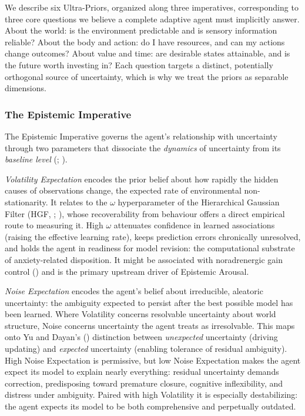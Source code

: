 \documentclass[
  jou,
  floatsintext,
  longtable,
  nolmodern,
  notxfonts,
  notimes,
  12pt,
  colorlinks=true,linkcolor=blue,citecolor=blue,urlcolor=blue]{apa7}
\begin{document}
We describe six Ultra-Priors, organized along three imperatives,
corresponding to three core questions we believe a complete adaptive
agent must implicitly answer. About the world: is the environment
predictable and is sensory information reliable? About the body and
action: do I have resources, and can my actions change outcomes? About
value and time: are desirable states attainable, and is the future worth
investing in? Each question targets a distinct, potentially orthogonal
source of uncertainty, which is why we treat the priors as separable
dimensions.

\subsubsection{The Epistemic Imperative}\label{the-epistemic-imperative}

The Epistemic Imperative governs the agent's relationship with
uncertainty through two parameters that dissociate the \emph{dynamics}
of uncertainty from its \emph{baseline level}
(;
).

\emph{Volatility Expectation} encodes the prior belief about how rapidly
the hidden causes of observations change, the expected rate of
environmental non-stationarity. It relates to the \(\omega\)
hyperparameter of the Hierarchical Gaussian Filter (HGF,
;
), whose
recoverability from behaviour offers a direct empirical route to
measuring it. High \(\omega\) attenuates confidence in learned
associations (raising the effective learning rate), keeps prediction
errors chronically unresolved, and holds the agent in readiness for
model revision: the computational substrate of anxiety-related
disposition. It might be associated with noradrenergic gain control
() and is the primary upstream driver of Epistemic Arousal.

\emph{Noise Expectation} encodes the agent's belief about irreducible,
aleatoric uncertainty: the ambiguity expected to persist after the best
possible model has been learned. Where Volatility concerns resolvable
uncertainty about world structure, Noise concerns uncertainty the agent
treats as irresolvable. This maps onto Yu and Dayan's
() distinction between
\emph{unexpected} uncertainty (driving updating) and \emph{expected}
uncertainty (enabling tolerance of residual ambiguity). High Noise
Expectation is permissive, but low Noise Expectation makes the agent
expect its model to explain nearly everything: residual uncertainty
demands correction, predisposing toward premature closure, cognitive
inflexibility, and distress under ambiguity. Paired with high Volatility
it is especially destabilizing: the agent expects its model to be both
comprehensive and perpetually outdated.
\end{document}
